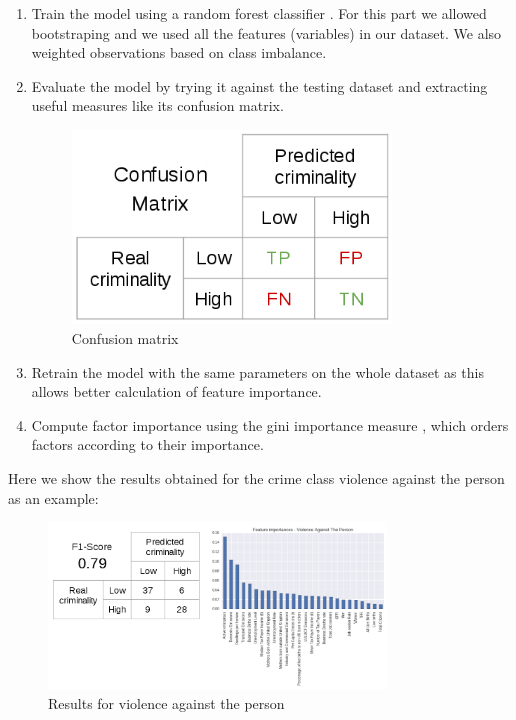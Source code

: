 \documentclass[12pt, openany]{report}
\begin{document}
\begin{enumerate}
\item Train the model using a random forest classifier \cite{breiman01}. For this part we allowed bootstraping and we used all the features (variables) in our dataset. We also weighted observations based on class imbalance.
\item Evaluate the model by trying it against the testing dataset and extracting useful measures like its confusion matrix.

\begin{figure}[h!]
\centering
        \includegraphics[width=0.8\textwidth]{images/confusion_matrix.png}
        \caption{Confusion matrix}
\end{figure}

\item Retrain the model with the same parameters on the whole dataset as this allows better calculation of feature importance.
\item Compute factor importance using the gini importance measure \cite{breiman84}, which orders factors according to their importance.

\end{enumerate}

Here we show the results obtained for the crime class violence against the person as an example:

\begin{figure}[h!]
\centering
        \includegraphics[width=0.8\textwidth]{images/results_violence_person.png}
        \caption{Results for violence against the person}
\end{figure}
\end{document}
